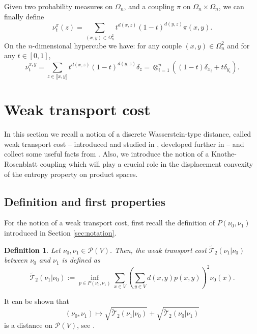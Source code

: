 \documentclass[11pt]{amsart}
\newtheorem{defi}[equation]{Definition}
\numberwithin{equation}{section}
\begin{document}
Given two probability measures on $\Omega_n$, and a coupling $\pi$ on $\Omega_n \times \Omega_n$, we can finally define
$$
\nu_t^\pi (z) = \sum_{(x,y)\in \Omega_n^2} t^{d(x,z)}(1-t)^{d(y,z)} \pi(x,y) .
$$
On the $n$-dimensional hypercube we have:
\noindent for any couple $(x,y)\in \Omega_n^2$ and for any $t \in [0,1]$,
$$
\nu_t^{x,y} =  \sum_{z \in \llbracket x,y\rrbracket}t^{d(x,z)}(1-t)^{d(y,z)}\delta_z = \otimes_{i=1}^n ((1-t) \delta_{x_i} + t\delta_{y_i}).
$$

\section{Weak transport cost} \label{sec:wtc}

In this section we recall a notion of a discrete Wasserstein-type distance, called weak transport cost -- introduced and studied in \cite{marton96, samson},
developed further in \cite{GRST} --  and collect some useful facts from \cite{GRST}.
Also, we introduce the notion of a  Knothe-Rosenblatt coupling which will play a crucial role in the displacement convexity of the entropy property on product spaces.

\subsection{Definition and first properties}

For the notion of a weak transport cost, first recall the definition of $P(\nu_0,\nu_1)$ introduced in Section \ref{sec:notation}.

\begin{defi} \label{weak}
Let $\nu_0, \nu_1 \in \mathcal{P}(V)$. Then, the weak transport cost ${\widetilde{\mathcal{T}}}_{2}(\nu_1 |\nu_0 )$ between $\nu_0$ and $\nu_1$ is defined as
$$
{\widetilde{\mathcal{T}}}_{2}(\nu_1 |\nu_0 ):=\inf_{p \in P(\nu_0,\nu_1)} \sum_{x \in V} \left( \sum_{y \in V} d(x,y) p(x,y) \right)^2 \nu_0(x) .
$$

\end{defi}

It can be shown that $$(\nu_{0},\nu_{1})\mapsto \sqrt{{\widetilde{\mathcal{T}}}_2(\nu_{1}|\nu_{0})} +\sqrt{{\widetilde{\mathcal{T}}}_2(\nu_{0}|\nu_{1})}$$ is a distance on $\mathcal{P}(V)$, see \cite{GRST}.
\end{document}
